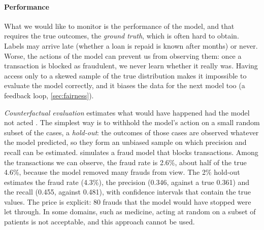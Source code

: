 \paragraph{Performance} What we would like to monitor is the performance of the model, and that
requires the true outcomes, the \emph{ground truth}, which is often hard to obtain. Labels may arrive late
(whether a loan is repaid is known after months) or never. Worse, the actions of the model can prevent us
from observing them: once a transaction is blocked as fraudulent, we never learn whether it really was.
Having access only to a skewed sample of the true distribution makes it impossible to evaluate the model
correctly, and it biases the data for the next model too (a feedback loop, \cref{sec:fairness}).

\emph{Counterfactual evaluation} estimates what would have happened had the model not acted
\citep{bottou2013counterfactual}. The simplest way is to withhold the model's action on a small random
subset of the cases, a \emph{hold-out}: the outcomes of those cases are observed whatever the model
predicted, so they form an unbiased sample on which precision and recall can be estimated.
 simulates a fraud model that blocks transactions. Among the transactions we can observe,
the fraud rate is 2.6\%, about half of the true 4.6\%, because the model removed many frauds from view. The
2\% hold-out estimates the fraud rate (4.3\%), the precision (0.346, against a true 0.361) and the recall
(0.455, against 0.481), with confidence intervals that contain the true values. The price is explicit: 80
frauds that the model would have stopped were let through. In some domains, such as medicine, acting at
random on a subset of patients is not acceptable, and this approach cannot be used.

